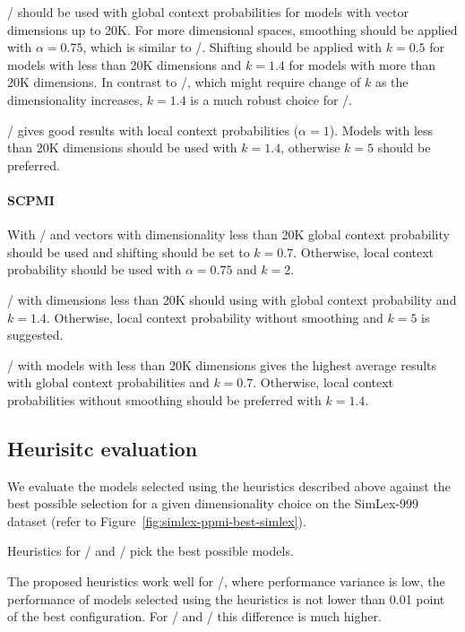 \documentclass[11pt]{article}
\begin{document}


\logNSPMI/ should be used with global context probabilities for models with vector dimensions up to 20K. For more dimensional spaces, smoothing should be applied with $\alpha = 0.75$, which is similar to \SPMI/. Shifting should be applied with $k = 0.5$ for models with less than 20K dimensions and $k = 1.4$ for models with more than 20K dimensions. In contrast to \SPMI/, which might require change of $k$ as the dimensionality increases, $k = 1.4$ is a much robust choice for \logNSPMI/.

\NSPMI/ gives good results with local context probabilities ($\alpha = 1$). Models with less than 20K dimensions should be used with $k = 1.4$, otherwise $k = 5$ should be preferred.

\paragraph{SCPMI}

With \SCPMI/ and vectors with dimensionality less than 20K global context probability should be used and shifting should be set to $k = 0.7$. Otherwise, local context probability should be used with $\alpha = 0.75$ and $k = 2$.

\NSCPMI/ with dimensions less than 20K should using with global context probability and $k = 1.4$. Otherwise, local context probability without smoothing and $k = 5$ is suggested.

\logNSCPMI/ with models with less than 20K dimensions gives the highest average results with global context probabilities and $k = 0.7$. Otherwise, local context probabilities without smoothing should be preferred with $k = 1.4$.

\subsection{Heurisitc evaluation}
\label{sec:heurisitc-evaluation}

We evaluate the models selected using the heuristics described above against the best possible selection for a given dimensionality choice on the SimLex-999 dataset (refer to Figure~\ref{fig:simlex-ppmi-best-simlex}).

Heuristics for \logNPMI/ and \logNCPMI/ pick the best possible models.

The proposed heuristics work well for \logNSPMI/, where performance variance is low, the performance of models selected using the heuristics is not lower than 0.01 point of the best configuration. For \SPMI/ and \NSPMI/ this difference is much higher.
\end{document}
